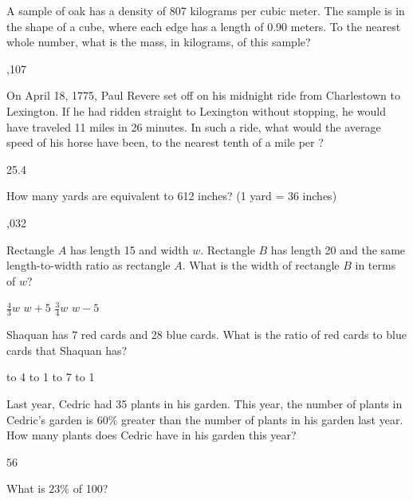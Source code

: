 \question[1]
A sample of oak has a density of 807 kilograms per cubic meter. The sample is in the shape of a cube, where each edge has a length of 0.90 meters. To the nearest whole number, what is the mass, in kilograms, of this sample?
\begin{choices}
  ,107
\end{choices}



\question[1]
On April 18, 1775, Paul Revere set off on his midnight ride from Charlestown to Lexington. 
If he had ridden straight to Lexington without stopping, he would have traveled 11 miles 
in 26 minutes. In such a ride, what would the average speed of his horse have been, to 
the nearest tenth of a mile per ?
\begin{solution}
25.4
\end{solution}


\newpage

\question[1]
How many yards are equivalent to 612 inches? (1 yard = 36 inches)
\begin{choices}
  ,032
\end{choices}



\question[1]
Rectangle $A$ has length 15 and width $w$. Rectangle $B$ has length 20 and the same length-to-width ratio as rectangle $A$. What is the width of rectangle $B$ in terms of $w$?
\begin{choices}
  \CorrectChoice $\frac{4}{3}w$
  \choice $w+5$
  \choice $\frac{3}{4}w$
  \choice $w-5$
\end{choices}

\question[1]
Shaquan has 7 red cards and 28 blue cards. What is the ratio of red cards to blue cards that Shaquan has?
\begin{choices}
   to 4
   to 1
   to 7
   to 1
\end{choices}

\question[1]
Last year, Cedric had 35 plants in his garden. This year, the number of plants in Cedric's garden is $60\%$ greater than the number of plants in his garden last year. How many plants does Cedric have in his garden this year?
\begin{solution}
56
\end{solution}


\newpage

\question[1]
What is $23\%$ of 100?
\begin{choices}
\end{choices}

